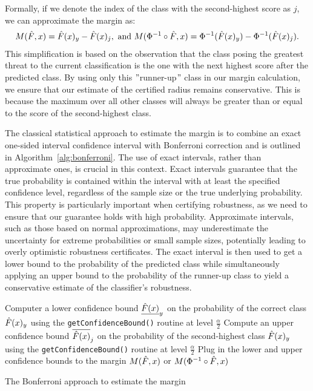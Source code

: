 Formally, if we denote the index of the class with the second-highest score as $j$, we can approximate the margin as:
\begin{align*}
    M(\Hat{F},x) =\Hat{F}(x)_{y} - \Hat{F}(x)_j, \text{ and }M(\Phi^{-1}\circ\Hat{F},x) =\Phi^{-1}(\Hat{F}(x)_{y}) - \Phi^{-1}(\Hat{F}(x)_j).
\end{align*}
This simplification is based on the observation that the class posing the greatest threat to the current classification is the one with the next highest score after the predicted class.
By using only this \("\)runner-up\("\) class in our margin calculation, we ensure that our estimate of the certified radius remains conservative.
This is because the maximum over all other classes will always be greater than or equal to the score of the second-highest class.

The classical statistical approach to estimate the margin is to combine an exact one-sided interval confidence interval with Bonferroni correction and is outlined in Algorithm~\ref{alg:bonferroni}.
The use of exact intervals, rather than approximate ones, is crucial in this context.
Exact intervals guarantee that the true probability is contained within the interval with at least the specified confidence level, regardless of the sample size or the true underlying probability.
This property is particularly important when certifying robustness, as we need to ensure that our guarantee holds with high probability.
Approximate intervals, such as those based on normal approximations, may underestimate the uncertainty for extreme probabilities or small sample sizes, potentially leading to overly optimistic robustness certificates.
The exact interval is then used to get a lower bound to the probability of the predicted class while simultaneously applying an upper bound to the probability of the runner-up class to yield a conservative estimate of the classifier's robustness.

\begin{algorithm}[H]
    \DontPrintSemicolon %

    Computer a lower confidence bound $\underline{\Hat{F}(x)}_{y}$ on the probability of the correct class $\Hat{F}(x)_{y}$ using the \texttt{getConfidenceBound()} routine at level $\frac{\alpha}{2}$\;
    Compute an upper confidence bound $\overline{\Hat{F}(x)}_{j}$ on the probability of the second-highest class $\Hat{F}(x)_{y}$ using the \texttt{getConfidenceBound()} routine at level $\frac{\alpha}{2}$\;
    Plug in the lower and upper confidence bounds to the margin $M(\Hat{F},x)$ or $M(\Phi^{-1}\circ\Hat{F},x)$\;
    \caption{The Bonferroni approach to estimate the margin}\label{alg:bonferroni}
\end{algorithm}

